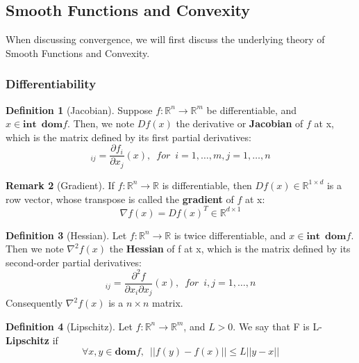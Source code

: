 \subsection{Smooth Functions and Convexity}
When discussing convergence, we will first discuss the underlying theory of Smooth Functions and Convexity. 

\subsubsection{Differentiability}

\textbf{Definition 1} (Jacobian). Suppose $f: \mathbb{R}^n \rightarrow \mathbb{R}^m$ be differentiable, and $x \in \textbf{int} \enspace  \textbf{dom} f$. Then, we note $Df(x)$ the derivative or \textbf{Jacobian} of $f$ at x, which is the matrix defined by its first partial derivatives: \newline 
\begin{equation}
    [Df(x)]_{ij} = \frac{\partial{f_i}}{\partial{x_j}}(x), \enspace for \enspace i = 1, \dots, m, j = 1, \dots, n
\end{equation}

\noindent \textbf{Remark 2} (Gradient). If $f: \mathbb{R}^n \rightarrow \mathbb{R}$ is differentiable, then $Df(x) \in \mathbb{R}^{1 \times d}$ is a row vector, whose transpose is called the \textbf{gradient} of $f$ at x: 
\begin{equation}
    \nabla f(x) = Df(x)^T \in \mathbb{R}^{d \times  1}
\end{equation}

\noindent \textbf{Definition 3} (Hessian). Let $f: \mathbb{R}^n \rightarrow \mathbb{R}$ is twice differentiable, and $x \in \textbf{int} \enspace  \textbf{dom} f$. Then we note $\nabla^2 f(x)$ the \textbf{Hessian} of f at x, which is the matrix defined by its second-order partial derivatives:
\begin{equation}
    [\nabla^2 f(x)]_{ij} = \frac{\partial^2{f}}{\partial{x_i}\partial{x_j}}(x), \enspace for \enspace i, j = 1, \dots, n
\end{equation}
Consequently $\nabla^2 f(x)$ is a $n \times n$ matrix. 

\noindent \textbf{Definition 4} (Lipschitz). Let $f: \mathbb{R}^n \rightarrow \mathbb{R}^m$, and $L > 0$. We say that F is L-\textbf{Lipschitz} if
\begin{equation}
    \forall x, y \in \textbf{dom} f, \enspace ||f(y) - f(x)|| \leq L ||y - x||
\end{equation}

